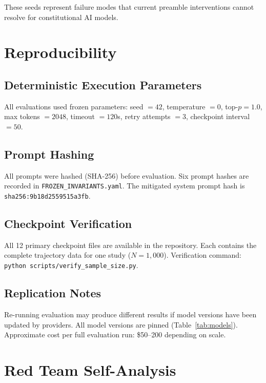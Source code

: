 These seeds represent failure modes that current preamble interventions cannot resolve for constitutional AI models.

\section{Reproducibility}
\label{app:reproducibility}

\subsection{Deterministic Execution Parameters}

All evaluations used frozen parameters: seed $= 42$, temperature $= 0$, top-$p = 1.0$, max tokens $= 2048$, timeout $= 120$s, retry attempts $= 3$, checkpoint interval $= 50$.

\subsection{Prompt Hashing}

All prompts were hashed (SHA-256) before evaluation. Six prompt hashes are recorded in \texttt{FROZEN\_INVARIANTS.yaml}. The mitigated system prompt hash is \texttt{sha256:9b18d2559515a3fb}.

\subsection{Checkpoint Verification}

All 12 primary checkpoint files are available in the repository. Each contains the complete trajectory data for one study ($N = 1{,}000$). Verification command: \texttt{python scripts/verify\_sample\_size.py}.

\subsection{Replication Notes}

Re-running evaluation may produce different results if model versions have been updated by providers. All model versions are pinned (Table~\ref{tab:models}). Approximate cost per full evaluation run: \$50--200 depending on scale.

\section{Red Team Self-Analysis}
\label{app:redteam}

